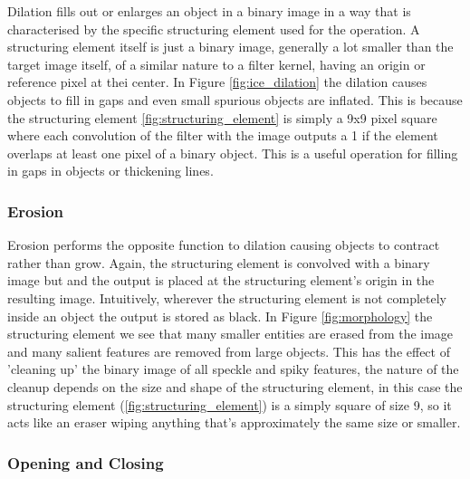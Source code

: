 Dilation fills out or enlarges an object in a binary image in a way that is characterised by the specific structuring element used for the operation. A structuring element itself is just a binary image, generally a lot smaller than the target image itself, of a similar nature to a filter kernel, having an origin or reference pixel at thei center. In Figure \ref{fig:ice_dilation} the dilation causes objects to fill in gaps and even small spurious objects are inflated. This is because the structuring element \ref{fig:structuring_element} is simply a 9x9 pixel square where each convolution of the filter with the image outputs a 1 if the element overlaps at least one pixel of a binary object. This is a useful operation for filling in gaps in objects or thickening lines.


\subsubsection{Erosion}

Erosion performs the opposite function to dilation causing objects to contract rather than grow. Again, the structuring element is convolved with a binary image but and the output is placed at the structuring element's origin in the resulting image. Intuitively, wherever the structuring element is not completely inside an object the output is stored as black. In Figure \ref{fig:morphology} the structuring element we see that many smaller entities are erased from the image and many salient features are removed from large objects. This has the effect of 'cleaning up' the binary image of all speckle and spiky features, the nature of the cleanup depends on the size and shape of the structuring element, in this case the structuring element (\ref{fig:structuring_element}) is a simply square of size 9, so it acts like an eraser wiping anything that's approximately the same size or smaller.


\subsubsection{Opening and Closing}


